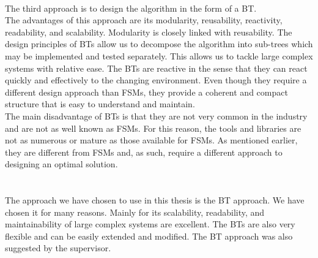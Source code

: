     \\
        The third approach is to design the algorithm in the form of a BT.\\
        The advantages of this approach are its modularity, reusability, reactivity, readability, and scalability. Modularity is closely linked with reusability. The design principles of BTs allow us to decompose the algorithm into sub-trees which may be implemented and tested separately. This allows us to tackle large complex systems with relative ease. The BTs are reactive in the sense that they can react quickly and effectively to the changing environment. Even though they require a different design approach than FSMs, they provide a coherent and compact structure that is easy to understand and maintain.\\
        The main disadvantage of BTs is that they are not very common in the industry and are not as well known as FSMs. For this reason, the tools and libraries are not as numerous or mature as those available for FSMs. As mentioned earlier, they are different from FSMs and, as such, require a different approach to designing an optimal solution.\\\\
    \\
        The approach we have chosen to use in this thesis is the BT approach. We have chosen it for many reasons. Mainly for its scalability, readability, and maintainability of large complex systems are excellent. The BTs are also very flexible and can be easily extended and modified. The BT approach was also suggested by the supervisor.\\